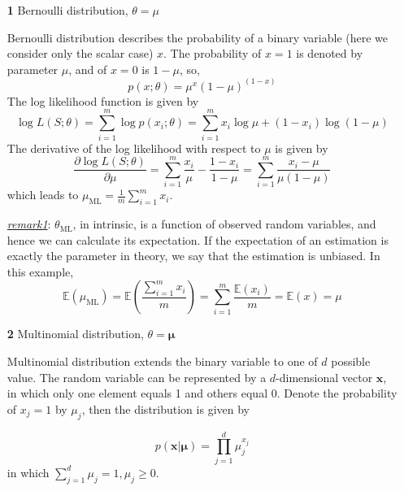 \documentclass{article}
\begin{document}
	\begin{itemize}
	\item [\textbf{1}] Bernoulli distribution, $\theta={\mu}$
	
	Bernoulli distribution describes the probability of a binary variable (here we consider only the scalar case) $x$. The probability of $x=1$ is denoted by parameter $\mu$, and of $x=0$ is $1-\mu$, so,
	\begin{equation*}
	p(x;\theta)=\mu^x(1-\mu)^{(1-x)}
	\end{equation*}
	The log likelihood function is given by
	\begin{equation*}
	\log L(S;\theta) = \sum_{i=1}^m \log p(x_i;\theta) = \sum_{i=1}^m x_i\log \mu + (1-x_i)\log(1-\mu)
	\end{equation*}
The derivative of the log likelihood with respect to $\mu$ is given by
	\begin{equation*}
	\frac{\partial \log L(S;\theta)}{\partial \mu} = \sum_{i=1}^m \frac{x_i}{\mu} - \frac{1-x_i}{1-\mu} = \sum_{i=1}^m \frac{x_i-\mu}{\mu(1-\mu)}
	\end{equation*}
which leads to $\mu_{\mathrm{ML}}=\frac{1}{m}\sum_{i=1}^m x_i$.
	\begin{footnotesize}
	
	\textit{\underline{remark1}}: $\theta_{\mathrm{ML}}$, in intrinsic, is a function of observed random variables, and hence we can calculate its expectation. If the expectation of an estimation is exactly the parameter in theory, we say that the estimation is unbiased. In this example,
	\begin{equation*} 
	\mathbb{E} (\mu_\mathrm{ML}) = \mathbb{E} \left(\frac{\sum_{i=1}^m x_i}{m}\right) =  \sum_{i=1}^m  \frac{\mathbb{E}(x_i)}{m} = \mathbb{E}(x) = \mu
	\end{equation*}
	\end{footnotesize}
	
	\item [\textbf{2}] Multinomial distribution, $\theta=\bm{\mu}$
	
	Multinomial distribution extends the binary variable to one of $d$ possible value. The random variable can be represented by a $d$-dimensional vector $\bm{x}$, in which only one element equals 1 and others equal 0. Denote the probability of $x_j=1$ by $\mu_j$, then the distribution is given by
	
	\begin{equation*}
	p(\bm{x}|\bm{\mu}) = \prod_{j=1}^d \mu_j^{x_j}
	\end{equation*}
in which $\sum_{j=1}^d \mu_j=1, \mu_j\geq 0$.
		

\end{itemize}
\end{document}

